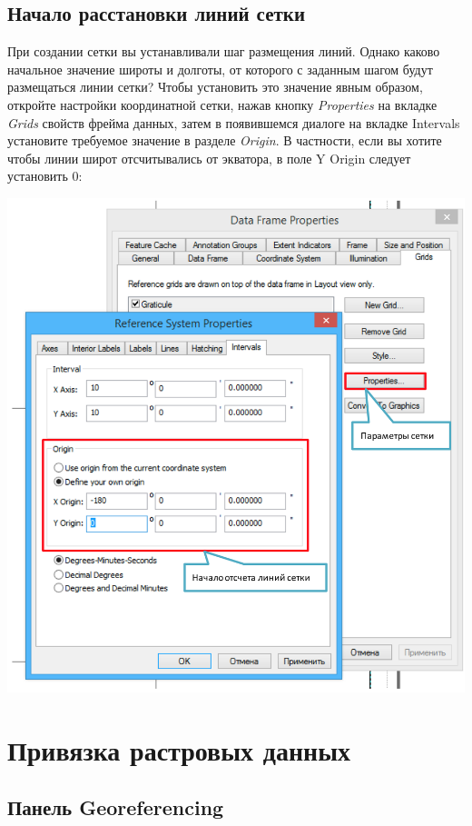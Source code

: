 \documentclass[]{book}
\theoremstyle{definition}
\theoremstyle{definition}
\theoremstyle{definition}
\theoremstyle{remark}
\begin{document}
\hypertarget{---}{%
\section{Начало расстановки линий сетки}\label{---}}

При создании сетки вы устанавливали шаг размещения линий. Однако каково
начальное значение широты и долготы, от которого с заданным шагом будут
размещаться линии сетки? Чтобы установить это значение явным образом,
откройте настройки координатной сетки, нажав кнопку \emph{Properties} на
вкладке \emph{Grids} свойств фрейма данных, затем в появившемся диалоге
на вкладке Intervals установите требуемое значение в разделе
\emph{Origin}. В частности, если вы хотите чтобы линии широт
отсчитывались от экватора, в поле Y Origin следует установить 0:

\includegraphics{images/Appendix/image67.png}

\hypertarget{manual-georef}{%
\chapter{Привязка растровых данных}\label{manual-georef}}

\hypertarget{-georeferencing}{%
\section{Панель Georeferencing}\label{-georeferencing}}
\end{document}
